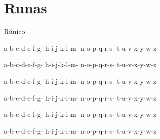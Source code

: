 
\newcommand{\SIG}[1]{{\par\nobreak
      \smallskip\hfill\footnotesize#1\par\medskip
  }}

\parskip0pt

\chapter{Runas}

Rúnico

a-b-c-d-e-f-g-
h-i-j-k-l-m-
n-o-p-q-r-s-
t-u-v-x-y-w-z

a-b-c-d-e-f-g-
h-i-j-k-l-m-
n-o-p-q-r-s-
t-u-v-x-y-w-z

a-b-c-d-e-f-g-
h-i-j-k-l-m-
n-o-p-q-r-s-
t-u-v-x-y-w-z

a-b-c-d-e-f-g-
h-i-j-k-l-m-
n-o-p-q-r-s-
t-u-v-x-y-w-z

a-b-c-d-e-f-g-
h-i-j-k-l-m-
n-o-p-q-r-s-
t-u-v-x-y-w-z

a-b-c-d-e-f-g-
h-i-j-k-l-m-
n-o-p-q-r-s-
t-u-v-x-y-w-z


%
%


%
